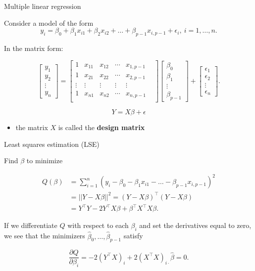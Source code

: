 \documentclass[ignorenonframetext,]{beamer}
\providecommand{\tightlist}{%
  \setlength{\itemsep}{0pt}\setlength{\parskip}{0pt}}
\begin{document}
\begin{frame}{Multiple linear regression}
\protect\hypertarget{multiple-linear-regression}{}

Consider a model of the form
\[y_i=\beta_0+\beta_1x_{i1}+\beta_2x_{i2}+\dots+\beta_{p-1}x_{i,p-1}+\epsilon_i,\ i=1,\dots,n.\]

In the matrix form:

\[
\left[
\begin{matrix}
y_1\\
y_2\\
\vdots\\
y_n
\end{matrix}
\right]
=
\left[
\begin{matrix}
1 & x_{11} & x_{12} & \cdots & x_{1,p-1}\\
1 & x_{21} & x_{22} & \cdots & x_{2,p-1}\\
\vdots & \vdots & \vdots & \vdots & \vdots & \\
1 & x_{n1} & x_{n2} & \cdots & x_{n,p-1}\\
\end{matrix}
\right]\left[
\begin{matrix}
\beta_0\\
\beta_1\\
\vdots\\
\beta_{p-1}
\end{matrix}
\right]+\left[
\begin{matrix}
\epsilon_1\\
\epsilon_2\\
\vdots\\
\epsilon_n
\end{matrix}
\right].
\]

\[Y=X\beta+\epsilon\]

\begin{itemize}
\tightlist
\item
  the matrix \(X\) is called the \textbf{design matrix}
\end{itemize}

\end{frame}

\begin{frame}{Least squares estimation (LSE)}
\protect\hypertarget{least-squares-estimation-lse}{}

Find \(\beta\) to minimize

\[
\begin{align}
Q(\beta)&=\sum_{i=1}^n(y_i-\beta_0-\beta_1x_{i1}-\dots-\beta_{p-1}x_{i,p-1})^2\\&=||Y-X\beta||^2=(Y-X\beta)^\top (Y-X\beta)\\
&=Y^\top Y-2Y^\top X\beta+\beta^\top X^\top X\beta.
\end{align}
\]

If we differentiate \(Q\) with respect to each \(\beta_i\) and set the
derivatives equal to zero, we see that the minimizers
\(\hat\beta_0,\dots,\hat\beta_{p-1}\) satisfy

\[\frac{\partial Q}{\partial \beta_i}=-2(Y^\top X)_i+2(X^{\top}X)_{i\cdot}\hat\beta=0.\]

\end{frame}
\end{document}
